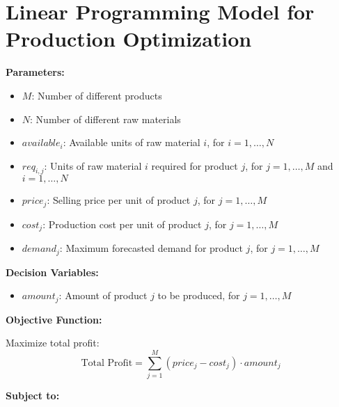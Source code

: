 \documentclass{article}
\begin{document}
\section*{Linear Programming Model for Production Optimization}

\textbf{Parameters:}
\begin{itemize}
    \item $M$: Number of different products
    \item $N$: Number of different raw materials
    \item $available_i$: Available units of raw material $i$, for $i = 1, \ldots, N$
    \item $req_{i,j}$: Units of raw material $i$ required for product $j$, for $j = 1, \ldots, M$ and $i = 1, \ldots, N$
    \item $price_j$: Selling price per unit of product $j$, for $j = 1, \ldots, M$
    \item $cost_j$: Production cost per unit of product $j$, for $j = 1, \ldots, M$
    \item $demand_j$: Maximum forecasted demand for product $j$, for $j = 1, \ldots, M$
\end{itemize}

\textbf{Decision Variables:}
\begin{itemize}
    \item $amount_j$: Amount of product $j$ to be produced, for $j = 1, \ldots, M$
\end{itemize}

\textbf{Objective Function:}

Maximize total profit:
\[
\text{Total Profit} = \sum_{j=1}^{M} (price_j - cost_j) \cdot amount_j
\]

\textbf{Subject to:}
\end{document}
